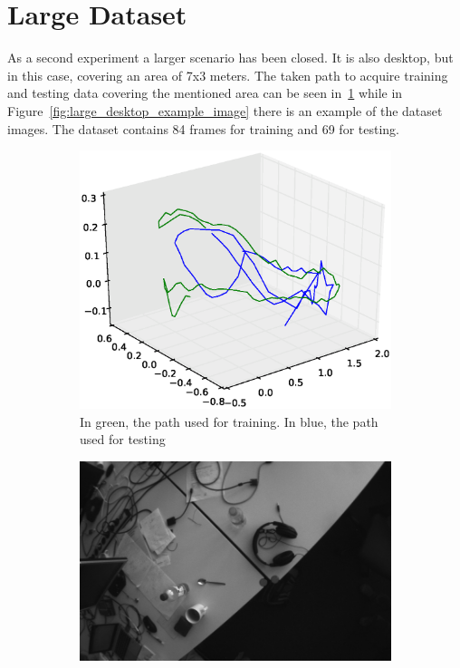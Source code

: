 \section{Large Dataset}
\label{sec:large_dataset}

As a second experiment a larger scenario has been closed. It is also desktop, but in this case, covering an area of 7x3 meters. The taken path to acquire training and testing data covering the mentioned area can be seen in~\ref{fig:large_desktop_train_test} while in Figure~\ref{fig:large_desktop_example_image} there is an example of the dataset images. The dataset contains 84 frames for training and 69 for testing.\\

\begin{figure}[htpb]
  \begin{subfigure}[b]{6cm}
          \includegraphics[width=\linewidth]{img/large_desktop/test_train_path.eps}
          \caption{In green, the path used for training. In blue, the path used for testing}                
          \label{fig:large_desktop_train_test}
  \end{subfigure}   
  \qquad
  \begin{subfigure}[b]{5cm}
         \includegraphics[width=\linewidth]{img/large_desktop/image00778.png}

\end{subfigure}
\end{figure}
